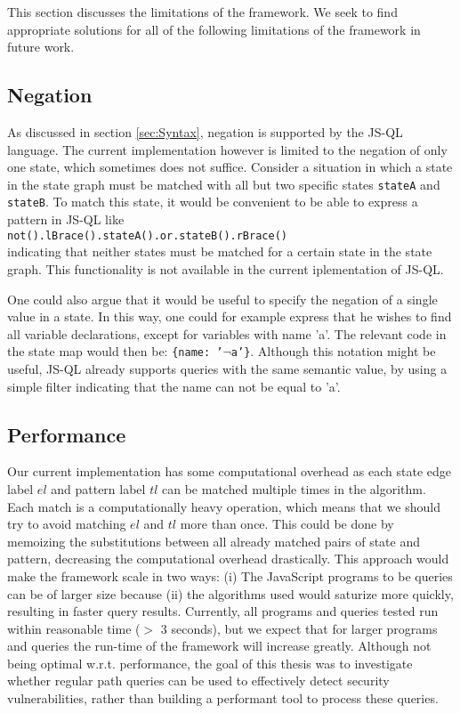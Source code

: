 This section discusses the limitations of the framework. We seek to find appropriate solutions for all of the following limitations of the framework in future work.

\subsection*{Negation}

As discussed in section \ref{sec:Syntax}, negation is supported by the JS-QL language. The current implementation however is limited to the negation of only one state, which sometimes does not suffice. Consider a situation in which a state in the state graph must be matched with all but two specific states \texttt{stateA} and \texttt{stateB}. To match this state, it would be convenient to be able to express a pattern in JS-QL like \\\texttt{not().lBrace().stateA().or.stateB().rBrace()}\\indicating that neither states must be matched for a certain state in the state graph. This functionality is not available in the current iplementation of JS-QL. 

One could also argue that it would be useful to specify the negation of a single value in a state. In this way, one could for example express that he wishes to find all variable declarations, except for variables with name 'a'. The relevant code in the state map would then be: \texttt{\{name: '$\neg$a'\}}. Although this notation might be useful, JS-QL already supports queries with the same semantic value, by using a simple filter indicating that the name can not be equal to 'a'.

\subsection*{Performance}

Our current implementation has some computational overhead as each state edge label $el$ and pattern label $tl$ can be matched multiple times in the algorithm. Each match is a computationally heavy operation, which means that we should try to avoid matching $el$ and $tl$ more than once. This could be done by memoizing the substitutions between all already matched pairs of state and pattern, decreasing the computational overhead drastically. This approach would make the framework scale in two ways: (i) The JavaScript programs to be queries can be of larger size because (ii) the algorithms used would saturize more quickly, resulting in faster query results. Currently, all programs and queries tested run within reasonable time ($>$ 3 seconds), but we expect that for larger programs and queries the run-time of the framework will increase greatly. Although not being optimal w.r.t. performance, the goal of this thesis was to investigate whether regular path queries can be used to effectively detect security vulnerabilities, rather than building a performant tool to process these queries.


